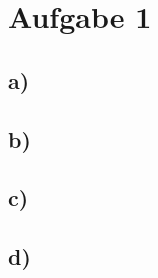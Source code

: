 \newpage
\section{Aufgabe 1}
\label{sec:a1}

\subsection{a)}
\label{subsec:a1a}

\subsection{b)}
\label{subsec:a1b}


\subsection{c)}
\label{subsec:a1c}

\subsection{d)}
\label{subsec:a1d}
